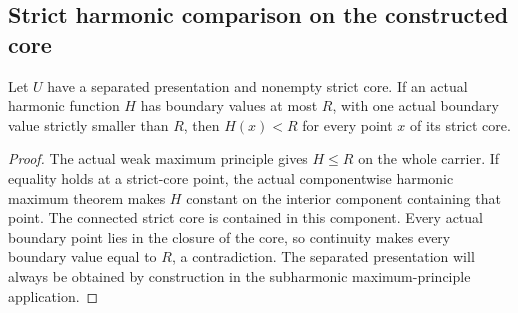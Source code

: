 \subsection{Strict harmonic comparison on the constructed core}\label{subsec:fc-line-separated-harmonic}

\begin{theorem}\label{thm:fc-separated-harmonic-strict-bound}
\leanok
{}
Let $U$ have a separated presentation and nonempty strict core. If an actual
harmonic function $H$ has boundary values at most $R$, with one actual
boundary value strictly smaller than $R$, then $H(x)<R$ for every point
$x$ of its strict core.
\end{theorem}

\begin{proof}
The actual weak maximum principle gives $H\le R$ on the whole carrier.
If equality holds at a strict-core point, the actual componentwise harmonic
maximum theorem makes $H$ constant on the interior component containing
that point. The connected strict core is contained in this component.
Every actual boundary point lies in the closure of the core, so continuity
makes every boundary value equal to $R$, a contradiction.
The separated presentation will always be obtained by construction in the
subharmonic maximum-principle application.
\end{proof}
